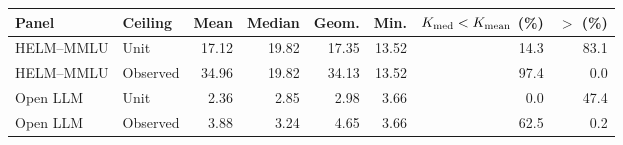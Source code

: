 \begin{tabular}{llrrrrrr}
\toprule
Panel & Ceiling & Mean & Median & Geom. & Min. & $K_{\rm med}<K_{\rm mean}$ (\%) & $>$ (\%) \\
\midrule
HELM--MMLU & Unit & 17.12 & 19.82 & 17.35 & 13.52 & 14.3 & 83.1 \\
HELM--MMLU & Observed & 34.96 & 19.82 & 34.13 & 13.52 & 97.4 & 0.0 \\
Open LLM & Unit & 2.36 & 2.85 & 2.98 & 3.66 & 0.0 & 47.4 \\
Open LLM & Observed & 3.88 & 3.24 & 4.65 & 3.66 & 62.5 & 0.2 \\
\bottomrule
\end{tabular}
